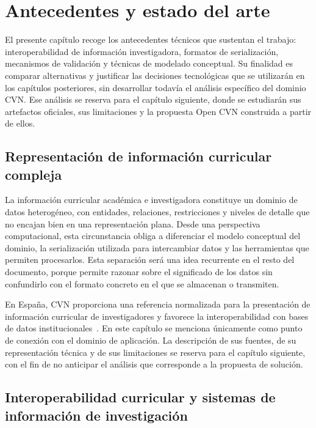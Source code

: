\chapter{Antecedentes y estado del arte}
\label{cap:estado_arte}

El presente capítulo recoge los antecedentes técnicos que sustentan el trabajo:
interoperabilidad de información investigadora, formatos de serialización,
mecanismos de validación y técnicas de modelado conceptual. Su finalidad es
comparar alternativas y justificar las decisiones tecnológicas que se utilizarán en
los capítulos posteriores, sin desarrollar todavía el análisis específico del
dominio CVN. Ese análisis se reserva para el capítulo siguiente,
donde se estudiarán sus artefactos oficiales, sus limitaciones y la propuesta Open
CVN construida a partir de ellos.

\section{Representación de información curricular compleja}
\label{sec:estado_arte_representacion_curricular}

La información curricular académica e investigadora constituye un dominio de datos
heterogéneo, con entidades, relaciones, restricciones y niveles de detalle que no
encajan bien en una representación plana. Desde una perspectiva computacional,
esta circunstancia obliga a diferenciar el modelo conceptual del dominio, la
serialización utilizada para intercambiar datos y las herramientas que permiten
procesarlos. Esta separación será una idea recurrente en el resto del documento,
porque permite razonar sobre el significado de los datos sin confundirlo con el
formato concreto en el que se almacenan o transmiten.

En España, CVN proporciona una referencia normalizada para la presentación de
información curricular de investigadores y favorece la interoperabilidad con bases
de datos institucionales~\cite{cvn_web}. En este capítulo se menciona únicamente
como punto de conexión con el dominio de aplicación. La descripción de sus
fuentes, de su representación técnica y de sus limitaciones se reserva para el
capítulo siguiente, con el fin de no anticipar el análisis que corresponde a la
propuesta de solución.

\section{Interoperabilidad curricular y sistemas de información de investigación}
\label{sec:estado_arte_interoperabilidad}

